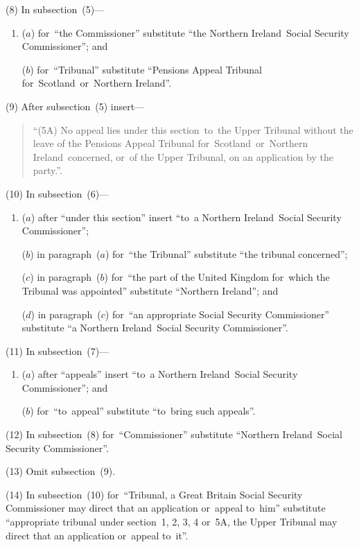 \documentclass[12pt,a4paper]{article}
\begin{document}
(8) In subsection~(5)—
\begin{enumerate}\item[]
($a$) for~“the Commissioner” substitute “the Northern Ireland~Social Security Commissioner”; and

($b$) for~“Tribunal” substitute “Pensions Appeal Tribunal for~Scotland~or~Northern Ireland”.
\end{enumerate}

(9) After subsection~(5) insert—
\begin{quotation}
“(5A) No appeal lies under this section~to~the Upper Tribunal without the leave of the Pensions Appeal Tribunal for~Scotland~or~Northern Ireland~concerned, or~of the Upper Tribunal, on an application by the party.”.
\end{quotation}

(10) In subsection~(6)—
\begin{enumerate}\item[]
($a$) after “under this section” insert “to~a Northern Ireland~Social Security Commissioner”;

($b$) in paragraph~($a$)  for~“the Tribunal” substitute “the tribunal concerned”;

($c$) in paragraph~($b$)  for~“the part of the United Kingdom for~which the Tribunal was appointed” substitute “Northern Ireland”; and

($d$) in paragraph~($c$)  for~“an appropriate Social Security Commissioner” substitute “a Northern Ireland~Social Security Commissioner”.
\end{enumerate}

(11) In subsection~(7)—
\begin{enumerate}\item[]
($a$) after “appeals” insert “to~a Northern Ireland~Social Security Commissioner”; and

($b$) for~“to~appeal” substitute “to~bring such appeals”.
\end{enumerate}

(12) In subsection~(8) for~“Commissioner” substitute “Northern Ireland~Social Security Commissioner”.

(13) Omit subsection~(9).

(14) In subsection~(10) for~“Tribunal, a Great Britain Social Security Commissioner may direct that an application or~appeal to~him” substitute “appropriate tribunal under section~1, 2, 3, 4 or~5A, the Upper Tribunal may direct that an application or~appeal to~it”.

\medskip
\end{document}
